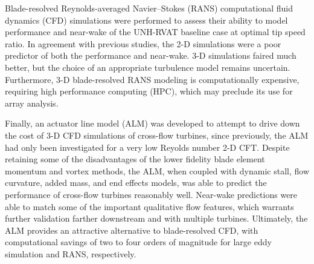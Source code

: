 \begin{Abstractpage}
{Blade-resolved Reynolds-averaged Navier--Stokes (RANS) computational fluid
dynamics (CFD) simulations were performed to assess their ability to model
performance and near-wake of the UNH-RVAT baseline case at optimal tip speed
ratio. In agreement with previous studies, the 2-D simulations were a poor
predictor of both the performance and near-wake. 3-D simulations faired much
better, but the choice of an appropriate turbulence model remains uncertain.
Furthermore, 3-D blade-resolved RANS modeling is computationally expensive,
requiring high performance computing (HPC), which may preclude its use for array
analysis.

Finally, an actuator line model (ALM) was developed to attempt to drive down the
cost of 3-D CFD simulations of cross-flow turbines, since previously, the ALM
had only been investigated for a very low Reyolds number 2-D CFT. Despite
retaining some of the disadvantages of the lower fidelity blade element momentum
and vortex methods, the ALM, when coupled with dynamic stall, flow curvature,
added mass, and end effects models, was able to predict the performance of
cross-flow turbines reasonably well. Near-wake predictions were able to match
some of the important qualitative flow features, which warrants further
validation farther downstream and with multiple turbines. Ultimately, the ALM
provides an attractive alternative to blade-resolved CFD, with computational
savings of two to four orders of magnitude for large eddy simulation and RANS,
respectively.

}


\end{Abstractpage}

